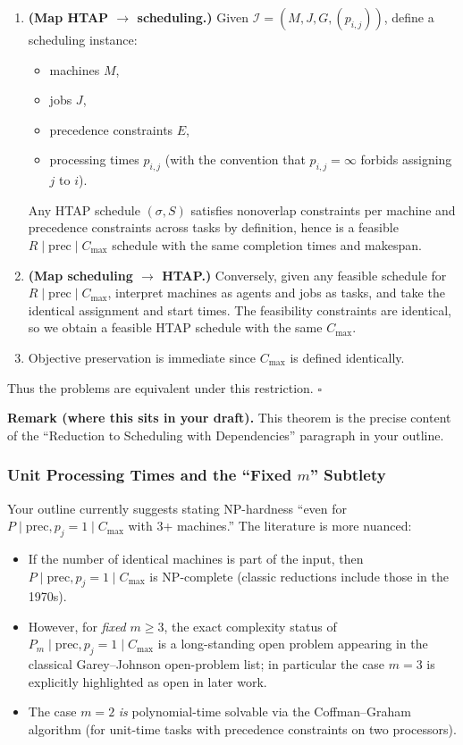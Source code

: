 \begin{enumerate}
\item \textbf{(Map HTAP \(\to\) scheduling.)} Given \(\mathcal{I}=(M,J,G,(p_{i,j}))\), define a scheduling instance:
\begin{itemize}
\item machines \(M\),
\item jobs \(J\),
\item precedence constraints \(E\),
\item processing times \(p_{i,j}\) (with the convention that \(p_{i,j}=\infty\) forbids assigning \(j\) to \(i\)).
\end{itemize}

Any HTAP schedule \((\sigma,S)\) satisfies nonoverlap constraints per machine and precedence constraints across tasks by definition, hence is a feasible \(R\mid\mathrm{prec}\mid C_{\max}\) schedule with the same completion times and makespan.

\item \textbf{(Map scheduling \(\to\) HTAP.)} Conversely, given any feasible schedule for \(R\mid\mathrm{prec}\mid C_{\max}\), interpret machines as agents and jobs as tasks, and take the identical assignment and start times. The feasibility constraints are identical, so we obtain a feasible HTAP schedule with the same \(C_{\max}\).

\item Objective preservation is immediate since \(C_{\max}\) is defined identically.
\end{enumerate}

Thus the problems are equivalent under this restriction. \(\square\)

\textbf{Remark (where this sits in your draft).} This theorem is the precise content of the ``Reduction to Scheduling with Dependencies'' paragraph in your outline.

\subsubsection{Unit Processing Times and the ``Fixed \(m\)'' Subtlety}

Your outline currently suggests stating NP-hardness ``even for \(P\mid \mathrm{prec}, p_j=1\mid C_{\max}\) with 3+ machines.'' The literature is more nuanced:

\begin{itemize}
\item If the number of identical machines is part of the input, then \(P\mid \mathrm{prec}, p_j=1\mid C_{\max}\) is NP-complete (classic reductions include those in the 1970s).
\item However, for \emph{fixed} \(m\ge 3\), the exact complexity status of \(P_m\mid \mathrm{prec}, p_j=1\mid C_{\max}\) is a long-standing open problem appearing in the classical Garey--Johnson open-problem list; in particular the case \(m=3\) is explicitly highlighted as open in later work.
\item The case \(m=2\) \emph{is} polynomial-time solvable via the Coffman--Graham algorithm (for unit-time tasks with precedence constraints on two processors).
\end{itemize}

